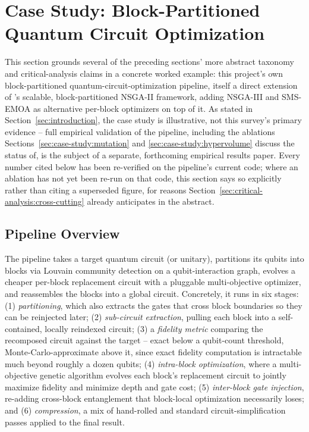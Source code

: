 \section{Case Study: Block-Partitioned Quantum Circuit Optimization}
\label{sec:case-study}

This section grounds several of the preceding sections' more abstract
taxonomy and critical-analysis claims in a concrete worked example: this
project's own block-partitioned quantum-circuit-optimization pipeline,
itself a direct extension of \citet{ghlib2026scalable}'s scalable,
block-partitioned NSGA-II framework, adding NSGA-III and SMS-EMOA as
alternative per-block optimizers on top of it. As stated in
Section~\ref{sec:introduction}, the case study is illustrative, not this
survey's primary evidence -- full empirical validation of the pipeline,
including the ablations Sections~\ref{sec:case-study:mutation} and
\ref{sec:case-study:hypervolume} discuss the status of, is the subject
of a separate, forthcoming empirical results paper. Every number cited
below has been re-verified on the pipeline's current code; where an
ablation has not yet been re-run on that code, this section says so
explicitly rather than citing a superseded figure, for reasons
Section~\ref{sec:critical-analysis:cross-cutting} already anticipates
in the abstract.

\subsection{Pipeline Overview}
\label{sec:case-study:pipeline}

The pipeline takes a target quantum circuit (or unitary), partitions its
qubits into blocks via Louvain community detection on a qubit-interaction
graph, evolves a cheaper per-block replacement circuit with a pluggable
multi-objective optimizer, and reassembles the blocks into a global
circuit. Concretely, it runs in six stages: (1) \emph{partitioning},
which also extracts the gates that cross block boundaries so they can be
reinjected later; (2) \emph{sub-circuit extraction}, pulling each block
into a self-contained, locally reindexed circuit; (3) a \emph{fidelity
metric} comparing the recomposed circuit against the target -- exact
below a qubit-count threshold, Monte-Carlo-approximate above it, since
exact fidelity computation is intractable much beyond roughly a dozen
qubits; (4) \emph{intra-block optimization}, where a multi-objective
genetic algorithm evolves each block's replacement circuit to jointly
maximize fidelity and minimize depth and gate cost; (5) \emph{inter-block
gate injection}, re-adding cross-block entanglement that block-local
optimization necessarily loses; and (6) \emph{compression}, a mix of
hand-rolled and standard circuit-simplification passes applied to the
final result.

